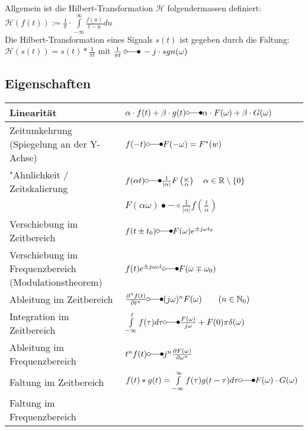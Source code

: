 Allgemein ist die Hilbert-Transformation $\mathcal{H}$ folgendermassen definiert: \\
$\mathcal{H}(f(t)) := \frac{1}{\pi} \cdot \int\limits_{-\infty}^{\infty} \frac{f(u)}{t-u}du$ \\
Die Hilbert-Transformation eines Signals $s(t)$ ist gegeben durch die Faltung: \\
$\mathcal{H}(s(t)) = s(t) * \frac{1}{\pi t}$ mit $\frac{1}{\pi t} \: \laplace \: -j \cdot sgn(\omega)$ \\

\subsection{Eigenschaften}
		\begin{tabular}{|p{8cm}|p{8cm}|}
        	\hline
        	Linearität & 
        	$\alpha\cdot f(t) + \beta\cdot g(t) \laplace \alpha\cdot F(\omega) +
        	\beta\cdot G(\omega)$\\
        	\hline
			Zeitumkehrung (Spiegelung an der Y-Achse)&
			$f(-t) \laplace F(-\omega) = F^*(w)$ \\
			\hline        	
  			"Ahnlichkeit / Zeitskalierung &
  			$f(\alpha t) \laplace \frac{1}{|\alpha|}F \left (\frac{\omega}{\alpha} \right)
  			\quad\alpha \in\mathbb{R}\setminus \{0\}$\\
				& $F(\alpha\omega) \bullet-\circ \frac{1}{|\alpha|}f(\frac{t}{\alpha})$ \\
  			\hline
  			Verschiebung im	Zeitbereich &
  			$f(t\pm t_0) \laplace F(\omega)e^{\pm j\omega t_0}$\\
  			\hline
			Verschiebung im Frequenzbereich (Modulationstheorem) &
			$f(t)e^{\pm j\omega_0 t} \laplace F(\omega\mp\omega_0)$\\
			\hline
			Ableitung im Zeitbereich &
			$\frac{\partial^n f(t)}{\partial t^n} \laplace (j\omega)^n F(\omega) \qquad (n \in \mathbb{N}_0)$\\
			\hline
			Integration im Zeitbereich &
			$\int\limits_{-\infty}^{t}f(\tau)d\tau \laplace
			\frac{F(\omega)}{j\omega}+F(0)\pi\delta(\omega)$\\
			\hline				
			Ableitung im Frequenzbereich &
			$t^n f(t) \laplace j^n \frac{\partial F(\omega)}{\partial \omega^n}$\\
			\hline		
			Faltung im Zeitbereich &
			$f(t) \ast g(t) = \int\limits_{-\infty}^{\infty} f(\tau)g(t-\tau)d\tau \laplace
			F(\omega) \cdot G(\omega)$\\
			\hline
			Faltung im Frequenzbereich &

\end{tabular}
